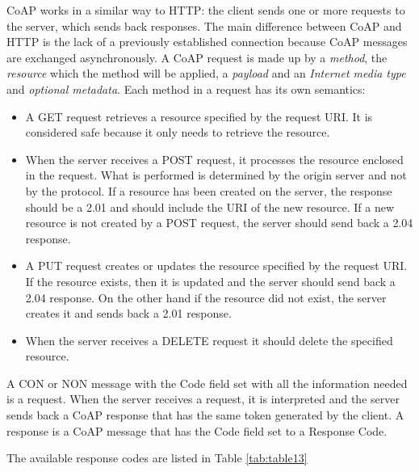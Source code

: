 	CoAP works in a similar way to HTTP: the client sends one or more requests to the server, which sends back responses.\newline
	The main difference between CoAP and HTTP is the lack of a previously established connection because CoAP messages are exchanged asynchronously.\newline
	A CoAP request is made up by a \emph{method}, the \emph{resource} which the method will be applied,
	a \emph{payload} and an \emph{Internet media type} and \emph{optional metadata}.\newline
	Each method in a request has its own semantics:
	\begin{itemize}
		\item A GET request retrieves a resource specified by the request URI.
		It is considered safe because it only needs to retrieve the resource.
		
		\item When the server receives a POST request, it processes the resource enclosed in the request.
		What is performed is determined by the origin server and not by the protocol.
		If a resource has been created on the server, the response should be a 2.01 and should include the URI of the new resource.
		If a new resource is not created by a POST request, the server should send back a 2.04 response.
		
		\item A PUT request creates or updates the resource specified by the request URI.
		If the resource exists, then it is updated and the server should send back a 2.04 response.
		On the other hand if the resource did not exist, the server creates it and sends back a 2.01 response.
		
		\item When the server receives a DELETE request it should delete the specified resource.
		
	\end{itemize}
	
	A CON or NON message with the Code field set with all the information needed is a request.\newline
	When the server receives a request, it is interpreted and the server sends back a CoAP response that has the same token generated by the client.\newline
	A response is a CoAP message that has the Code field set to a Response Code.\newline

	The available response codes are listed in Table \ref{tab:table13}

